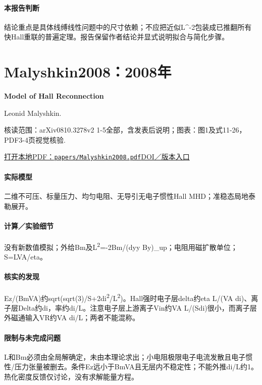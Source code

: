 \paragraph{本报告判断}结论重点是具体线缚线性问题中的尺寸依赖；不应把近似L\textasciicircum{}-2包装成已推翻所有快Hall重联的普遍定理。报告保留作者结论并显式说明拟合与简化步骤。

\section{Malyshkin2008：2008年}\label{paper:Malyshkin2008}

\textbf{Model of Hall Reconnection}\citep{Malyshkin2008}\

Leonid Malyshkin.

\textsf{核读范围：}arXiv0810.3278v2 1-5全部，含发表后说明；\textsf{图表：}图1及式11-26，PDF3-4页视觉核验.

\href{run:papers/Malyshkin2008.pdf}{打开本地PDF：\texttt{papers/Malyshkin2008.pdf}}\quad\href{https://doi.org/10.1103/physrevlett.101.225001}{DOI／版本入口}

\paragraph{实际模型}二维不可压、标量压力、均匀电阻、无导引无电子惯性Hall MHD；准稳态局地泰勒展开。

\paragraph{计算／实验细节}没有新数值模拟；外给Bm及L\textsuperscript{2}=-2Bm/(dyy By)\_up；电阻用磁扩散单位；S=LVA/eta。

\paragraph{核实的发现}Ez/(BmVA)约sqrt(sqrt(3)/S+2di\textsuperscript{2}/L\textsuperscript{2})。Hall强时电子层delta约eta L/(VA di)、离子层Delta约di，率约di/L。注意电子层上游离子Vin约VA L/(Sdi)很小，而离子层外磁通输入VR约VA di/L；两者不能混称。

\paragraph{限制与未完成问题}L和Bm必须由全局解确定，未由本理论求出；小电阻极限电子电流发散且电子惯性/压力张量被删去。条件Ez远小于BmVA且无层内不稳定性；不能外推di/L约1。热化密度反馈仅讨论，没有求解能量方程。

